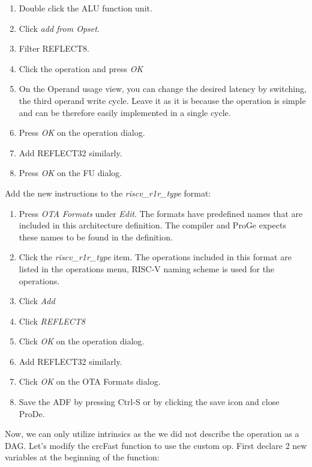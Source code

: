 \documentclass[a4paper,twoside]{tceusermanual}
\begin{document}

\begin{enumerate}
  \item%
    Double click the ALU function unit.
  \item%
    Click \emph{add from Opset}.
  \item%
    Filter REFLECT8.
  \item%
    Click the operation and press \emph{OK}
  \item%
    On the Operand usage view, you can change the desired latency by switching,
    the third operand write cycle. Leave it as it is because the operation is 
    simple and can be therefore easily implemented in a single cycle.
  \item%
    Press \emph{OK} on the operation dialog.
  \item%
    Add REFLECT32 similarly.
  \item%
    Press \emph{OK} on the FU dialog.
\end{enumerate}

Add the new instructions to the \emph{riscv\_r1r\_type} format:

\begin{enumerate}
  \item%
    Press \emph{OTA Formats} under \emph{Edit}.
    The formats have predefined names that are included in this
    architecture definition. The compiler and ProGe expects these names to be 
    found in the definition. 
  \item%
    Click the \emph{riscv\_r1r\_type} item.
    The operations included in this format are listed in the operations menu,
    RISC-V naming scheme is used for the operations.
  \item%
    Click \emph{Add}
  \item%
    Click \emph{REFLECT8}
  \item%
    Click \emph{OK} on the operation dialog.
  \item%
    Add REFLECT32 similarly.
  \item%
    Click \emph{OK} on the OTA Formats dialog.
  \item%
    Save the ADF by pressing Ctrl-S or by clicking the save icon and close ProDe.
\end{enumerate}

Now, we can only utilize intrinsics as the we did not describe the operation as a DAG.
Let's modify the crcFast function to use the custom op. First declare 2 new
variables at the beginning of the function:
\end{document}
